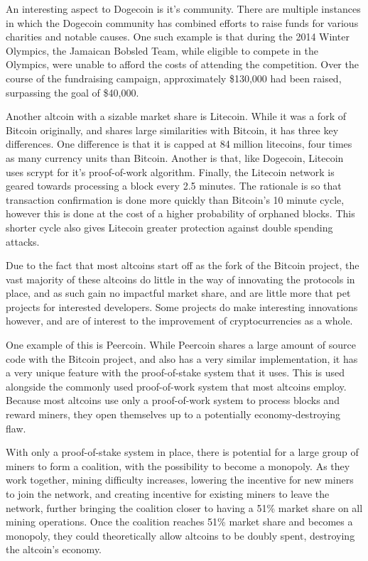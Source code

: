 \documentclass{article}
\begin{document}
	An interesting aspect to Dogecoin is it's community. There are multiple instances in which the Dogecoin community has combined efforts to raise funds for various charities and notable causes. One such example is that during the 2014 Winter Olympics, the Jamaican Bobsled Team, while eligible to compete in the Olympics, were unable to afford the costs of attending the competition. Over the course of the fundraising campaign, approximately \$130,000 had been raised, surpassing the goal of \$40,000.
	
	Another altcoin with a sizable market share is Litecoin. While it was a fork of Bitcoin originally, and shares large similarities with Bitcoin, it has three key differences. One difference is that it is capped at 84 million litecoins, four times as many currency units than Bitcoin. Another is that, like Dogecoin, Litecoin uses scrypt for it's proof-of-work algorithm. Finally, the Litecoin network is geared towards processing a block every 2.5 minutes. The rationale is so that transaction confirmation is done more quickly than Bitcoin's 10 minute cycle, however this is done at the cost of a higher probability of orphaned blocks. This shorter cycle also gives Litecoin greater protection against double spending attacks.

	Due to the fact that most altcoins start off as the fork of the Bitcoin project, the vast majority of these altcoins do little in the way of innovating the protocols in place, and as such gain no impactful market share, and are little more that pet projects for interested developers. Some projects do make interesting innovations however, and are of interest to the improvement of cryptocurrencies as a whole.
	
	One example of this is Peercoin. While Peercoin shares a large amount of source code with the Bitcoin project, and also has a very similar implementation, it has a very unique feature with the proof-of-stake system that it uses. This is used alongside the commonly used proof-of-work system that most altcoins employ. Because most altcoins use only a proof-of-work system to process blocks and reward miners, they open themselves up to a potentially economy-destroying flaw.
	
	With only a proof-of-stake system in place, there is potential for a large group of miners to form a coalition, with the possibility to become a monopoly. As they work together, mining difficulty increases, lowering the incentive for new miners to join the network, and creating incentive for existing miners to leave the network, further bringing the coalition closer to having a 51\% market share on all mining operations. Once the coalition reaches 51\% market share and becomes a monopoly, they could theoretically allow altcoins to be doubly spent, destroying the altcoin's economy.
	
\end{document}

